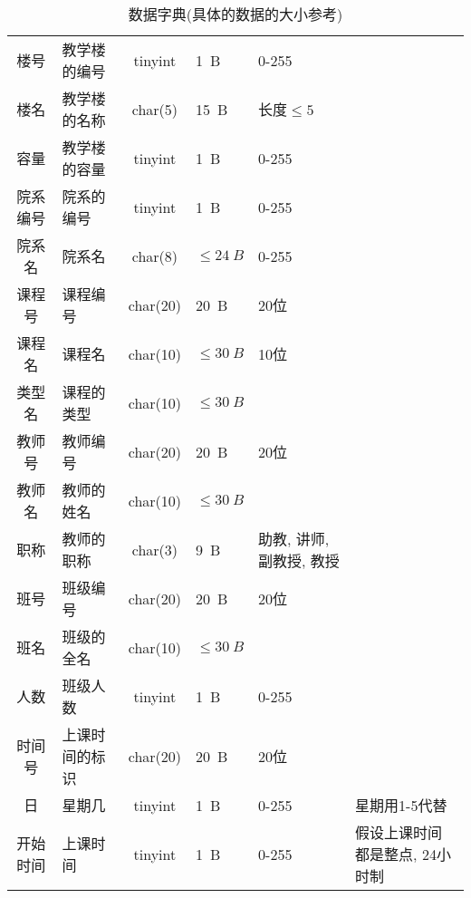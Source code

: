 \documentclass{myreport}
\begin{document}
    \begin{longtabu} to \textwidth {clcXXX}
      \caption{数据字典(具体的数据的大小参考\cite{tinyint})}
      \label{t:data_dict} \\
      \toprule[1.5pt]
          &
         &
         &
         &
         &
         \\
      \midrule[1pt]
      \endhead

      \bottomrule[1.5pt]
      \endfoot


        楼号    & 教学楼的编号 & tinyint & \SI{1}{B} & 0-255 & \\
        楼名    & 教学楼的名称 & char(5) & \SI{15}{B} & 长度$\le 5$ & \\
        容量    & 教学楼的容量 & tinyint & \SI{1}{B} & 0-255 & \\
        院系编号 & 院系的编号 & tinyint & \SI{1}{B} & 0-255 & \\
        院系名   & 院系名 & char(8) & $\le\SI{24}{B}$ & 0-255 & \\
        课程号   & 课程编号 & char(20) & \SI{20}{B} & 20位 & \\
        课程名   & 课程名 & char(10) & $\le \SI{30}{B}$ & 10位 & \\
        类型名   & 课程的类型 & char(10) & $\le \SI{30}{B}$ & \\
        教师号   & 教师编号 & char(20) & \SI{20}{B} & 20位 & \\
        教师名   & 教师的姓名 & char(10) & $\le \SI{30}{B}$ & \\
        职称     & 教师的职称 & char(3) &\SI{9}{B}  & 助教, 讲师, 副教授, 教授 \\
        班号     & 班级编号 & char(20) & \SI{20}{B} & 20位 & \\
        班名     & 班级的全名 & char(10) & $\le \SI{30}{B}$ & \\
        人数     & 班级人数 & tinyint & \SI{1}{B} & 0-255 & \\
        时间号   & 上课时间的标识 & char(20) & \SI{20}{B} & 20位 & \\
        日       & 星期几 & tinyint & \SI{1}{B} & 0-255 & 星期用1-5代替\\
        开始时间 & 上课时间 & tinyint & \SI{1}{B} & 0-255 & 假设上课时间都是整点, 24小时制\\

\end{longtabu}
\end{document}
